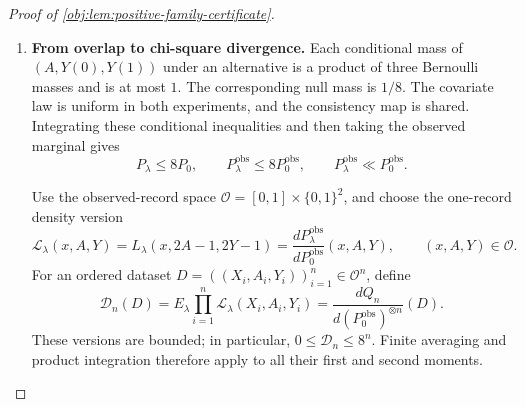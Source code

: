 \begin{proof}[Proof of \cref{obj:lem:positive-family-certificate}]
\begin{enumerate}
Let \(\lambda'\) be an independent uniform encoding, and define
\(E_{\lambda,\lambda'}=E_{\lambda'}E_\lambda\).
Averaging the fixed-\(\lambda'\) inequality gives
\[
\begin{aligned}
E_{\lambda,\lambda'}\exp(nH_{\lambda,\lambda'})
&=\frac1{2^{2|\mathcal J|}}
 \sum_{\lambda,\lambda'\in\{0,1\}^{\mathcal J}}
                      \exp(nH_{\lambda,\lambda'})\\
&\le\exp\!\left\{160n^2t^2h_{\mathrm L}\delta_{\mathrm L}\right\}.
\end{aligned}
\]

\item \textbf{From overlap to chi-square divergence.}
Each conditional mass of \((A,Y(0),Y(1))\) under an alternative is
a product of three Bernoulli masses and is at most \(1\).
The corresponding null mass is \(1/8\).
The covariate law is uniform in both experiments, and the consistency
map is shared. Integrating these conditional inequalities and then
taking the observed marginal gives
\[
P_\lambda\le8P_0,
\qquad
P_\lambda^{\mathrm{obs}}\le8P_0^{\mathrm{obs}},
\qquad
P_\lambda^{\mathrm{obs}}\ll P_0^{\mathrm{obs}}.
\]

Use the observed-record space
\(\mathcal O=[0,1]\times\{0,1\}^2\), and choose the one-record density
version
\[
\mathscr L_\lambda(x,A,Y)
=L_\lambda(x,2A-1,2Y-1)
=\frac{dP_\lambda^{\mathrm{obs}}}{dP_0^{\mathrm{obs}}}(x,A,Y),
\qquad (x,A,Y)\in\mathcal O.
\]
For an ordered dataset
\(D=((X_i,A_i,Y_i))_{i=1}^n\in\mathcal O^n\), define
\[
\mathscr D_n(D)
=E_\lambda\prod_{i=1}^n\mathscr L_\lambda(X_i,A_i,Y_i)
=\frac{dQ_n}{d(P_0^{\mathrm{obs}})^{\otimes n}}(D).
\]
These versions are bounded; in particular,
\(0\le\mathscr D_n\le8^n\).
Finite averaging and product integration therefore apply to all their
first and second moments.


\end{enumerate}
\end{proof}
